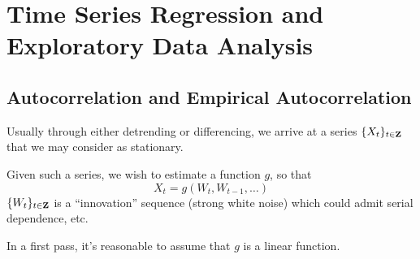 \chapter{Time Series Regression and Exploratory Data Analysis}
\section{Autocorrelation and Empirical Autocorrelation}
Usually through either detrending or differencing, we arrive
at a series $ \{X_t\}_{t\in\mathbf{Z}} $ that we may consider as stationary.

Given such a series, we wish to estimate a function $ g $, so that
\[ X_t=g(W_t,W_{t-1},\ldots) \]
$ \{W_t\}_{t\in\mathbf{Z}} $ is a ``innovation'' sequence (strong white noise)
which could admit serial dependence, etc.

In a first pass, it's reasonable to assume that $ g $ is a linear function.

